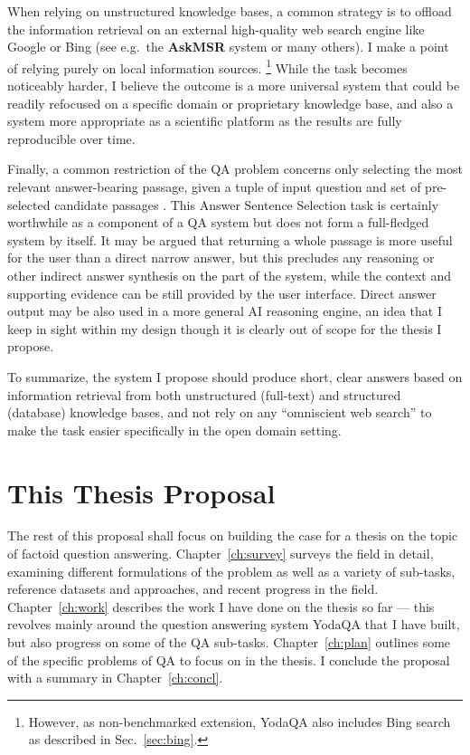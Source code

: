 When relying on unstructured knowledge bases, a common strategy is to offload
the information retrieval on an external high-quality web search engine
like Google or Bing (see e.g.\ the \textbf{AskMSR} system \citep{AskMSR}
or many others).
I make a point of relying purely on local information sources.%
\footnote{However, as non-benchmarked extension, YodaQA also includes
	Bing search as described in Sec.~\ref{sec:bing}.}
While the task becomes noticeably harder,
I believe the outcome is a more
universal system that could be readily refocused on a specific domain
or proprietary knowledge base, and also a system more appropriate as
a scientific platform as the results are fully reproducible over time.

Finally, a common restriction of the QA problem concerns only selecting
the most relevant answer-bearing passage, given a tuple of input question
and set of pre-selected candidate passages \citep{WangQAGrammar}.
This Answer Sentence Selection task is certainly
worthwhile as a component of a QA system but does not form a full-fledged
system by itself.
It may be argued that returning a whole passage is more useful for the user than a direct narrow answer,
but this precludes any reasoning or other indirect answer synthesis on the part of the system,
while the context and supporting evidence can be still provided by the user interface.
Direct answer output may be also used in a more general AI reasoning engine,
an idea that I keep in sight within my design though it is clearly
out of scope for the thesis I propose.

To summarize, the system I propose should produce short, clear answers
based on information retrieval from both
unstructured (full-text) and structured (database) knowledge bases,
and not rely on any ``omniscient web search'' to make the task easier
specifically in the open domain setting.

\section{This Thesis Proposal}

The rest of this proposal shall focus on building the case for
a thesis on the topic of factoid question answering.
Chapter~\ref{ch:survey}
surveys the field in detail, examining different formulations of the problem
as well as a variety of sub-tasks, reference datasets and approaches,
and recent progress in the field.
Chapter~\ref{ch:work} describes
the work I have done on the thesis so far --- this revolves mainly around
the question answering system YodaQA that I have built, but also progress
on some of the QA sub-tasks.
Chapter~\ref{ch:plan} outlines some of the specific problems of QA
to focus on in the thesis.
I conclude the proposal with a summary in Chapter~\ref{ch:concl}.
